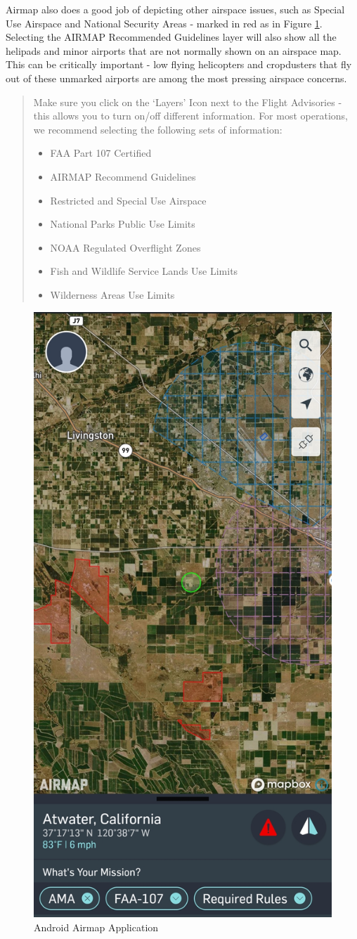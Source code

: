 \documentclass[
]{book}
\providecommand{\tightlist}{%
  \setlength{\itemsep}{0pt}\setlength{\parskip}{0pt}}
\begin{document}
Airmap also does a good job of depicting other airspace issues, such as Special Use Airspace and National Security Areas - marked in red as in Figure \ref{fig:airmap}. Selecting the AIRMAP Recommended Guidelines layer will also show all the helipads and minor airports that are not normally shown on an airspace map. This can be critically important - low flying helicopters and cropdusters that fly out of these unmarked airports are among the most pressing airspace concerns.

\begin{quote}
Make sure you click on the `Layers' Icon next to the Flight Advisories - this allows you to turn on/off different information. For most operations, we recommend selecting the following sets of information:

\begin{itemize}
\tightlist
\item
  FAA Part 107 Certified
\item
  AIRMAP Recommend Guidelines
\item
  Restricted and Special Use Airspace
\item
  National Parks Public Use Limits
\item
  NOAA Regulated Overflight Zones
\item
  Fish and Wildlife Service Lands Use Limits
\item
  Wilderness Areas Use Limits
\end{itemize}
\end{quote}

\begin{figure}

{\centering \includegraphics[width=0.5\linewidth]{images/Airmap-Android} 

}

\caption{Android Airmap Application}\label{fig:airmap}
\end{figure}
\end{document}
